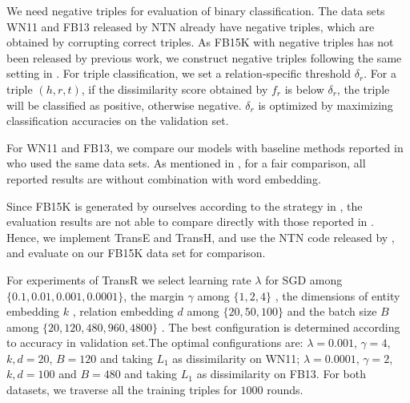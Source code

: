     We need negative triples for evaluation of binary classification. The data sets WN11 and FB13 released by NTN  already have negative triples, which are obtained by corrupting correct triples. As FB15K with negative triples has not been released by previous work, we construct negative triples following the same setting in . For triple classification, we set a relation-specific threshold $\delta_r$. For a triple $(h,r,t)$, if the dissimilarity score obtained by $f_r$ is below $\delta_r$, the triple will be classified as positive, otherwise negative. $\delta_r$ is optimized by maximizing classification accuracies on the validation set.

    For WN11 and FB13, we compare our models with baseline methods reported in  who used the same data sets. As mentioned in , for a fair comparison, all reported results are without combination with word embedding.

    Since FB15K is generated by ourselves according to the strategy in , the evaluation results are not able to compare directly with those reported in . Hence, we implement TransE and TransH, and use the NTN code released by , and evaluate on our FB15K data set for comparison.

    For experiments of TransR  we select learning rate $\lambda$ for SGD among $\{0.1, 0.01, 0.001,0.0001\}$, the margin $\gamma$ among $\{1, 2, 4\}$ , the dimensions of entity embedding $k$ , relation embedding $d$ among $\{20,50,100\}$ and the batch size $B$ among $\{20, 120, 480, 960, 4800\}$ . The best configuration is determined according to accuracy in validation set.The optimal configurations are: $\lambda = 0.001$, $\gamma= 4$, $k, d = 20$, $B = 120$  and taking $L_1$ as dissimilarity on WN11; $\lambda = 0.0001$, $\gamma= 2$, $k, d = 100$ and $B = 480$ and taking $L_1$ as dissimilarity on FB13. For both datasets, we traverse all the training triples for $1000$ rounds.

